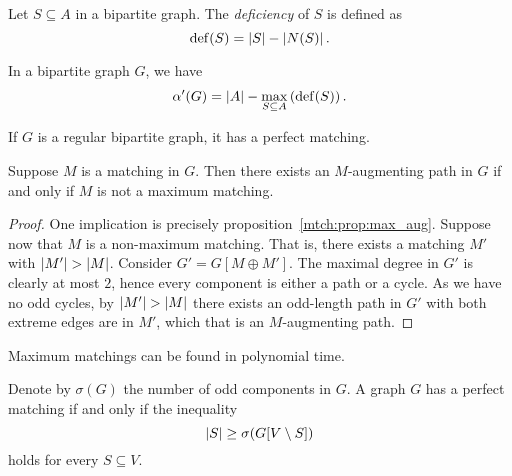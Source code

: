 \begin{definicija}
Let $S \subseteq A$ in a bipartite graph. The
\emph{deficiency} of $S$ is defined as
\[
\operatorname{def}(S) = \left\lvert S\right\rvert - \left\lvert N(S)\right\rvert.
\]
\end{definicija}

\begin{izrek}
In a bipartite graph $G$, we have
\[
\alpha'(G) = \left\lvert A\right\rvert - \max_{S \subseteq A} \left(\operatorname{def}(S)\right).
\]
\end{izrek}

\begin{izrek}
If $G$ is a regular bipartite graph, it has a perfect matching.
\end{izrek}

\obvs


\begin{izrek}
Suppose $M$ is a matching in $G$. Then there exists an
$M$-augmenting path in $G$ if and only if $M$ is not a maximum
matching.
\end{izrek}

\begin{proof}
One implication is precisely proposition~\ref{mtch:prop:max_aug}.
Suppose now that $M$ is a non-maximum matching. That is, there
exists a matching $M'$ with $\left\lvert M'\right\rvert > \left\lvert M\right\rvert$. Consider
$G' = G[M \oplus M']$. The maximal degree in $G'$ is clearly at
most $2$, hence every component is either a path or a cycle. As we
have no odd cycles, by $\left\lvert M'\right\rvert > \left\lvert M\right\rvert$ there exists an
odd-length path in $G'$ with both extreme edges are in $M'$, which
that is an $M$-augmenting path.
\end{proof}

\begin{opomba}
Maximum matchings can be found in polynomial time.
\end{opomba}

\begin{izrek}[Tutte]
Denote by $\sigma(G)$ the number of odd components in $G$. A graph
$G$ has a perfect matching if and only if the inequality
\[
\left\lvert S\right\rvert \geq \sigma(G[V \setminus S])
\]
holds for every $S \subseteq V$.
\end{izrek}

